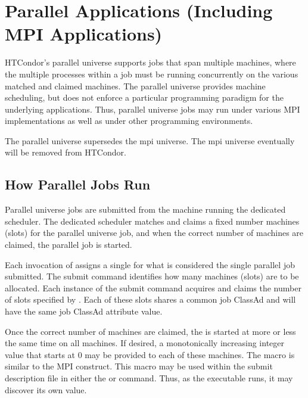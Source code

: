 \section{\label{sec:Parallel}Parallel Applications (Including MPI Applications)}

HTCondor's parallel universe supports jobs that span multiple machines,
where the multiple processes within a job must be running concurrently
on the various matched and claimed machines.
The parallel universe provides machine scheduling,
but does not enforce a particular programming paradigm for the
underlying applications.
Thus, parallel universe jobs may run under various MPI implementations
as well as under other programming environments. 

The parallel universe supersedes the mpi universe.
The mpi universe eventually will be removed from HTCondor.

\subsection{\label{sec:parallel-model}How Parallel Jobs Run}

Parallel universe jobs are submitted from the machine running 
the dedicated scheduler.
The dedicated scheduler matches and claims a fixed number machines (slots)
for the parallel universe job,
and when the correct number of machines are claimed,
the parallel job is started.

Each invocation of  assigns a single 
for what is considered the single parallel job submitted.
The  submit command identifies how 
many machines (slots) are to be allocated.
Each instance of the  submit command acquires
and claims the number of slots specified by .
Each of these slots shares a common job ClassAd and
will have the same  job ClassAd attribute value.

Once the correct number of machines are claimed, 
the  is started at more or less the same
time on all machines.
If desired, a monotonically increasing integer value that starts
at 0 may be provided to each of these machines.
The macro  is similar to the MPI 
construct. This macro may be used within the submit description
file in either the  or 
command.
Thus, as the executable runs, it may discover its own 
value.

